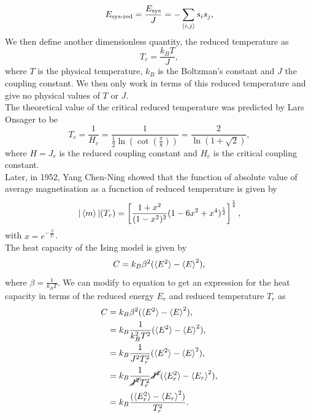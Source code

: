 \documentclass[twocolumn,a4paper,aps,amsmath,amssymb,floatfix,superscriptaddress]{revtex4-2}
\begin{document}
    \begin{equation}
        E_{\text{sys-red}} = \frac{E_{\text{sys}}}{J} = -\sum_{\braket{i, j}}s_is_j, \label{reduced_system_energy}
    \end{equation}
    We then define another dimensionless quantity, the reduced temperature as
    \begin{equation}
        T_r = \frac{k_BT}{J}, \label{reduced_temperature}
    \end{equation}
    where $T$ is the physical temperature, $k_B$ is the Boltzman's constant and $J$ the coupling constant. We then only work in terms of this reduced temperature and give no physical values of $T$ or $J$.\\
    The theoretical value of the critical reduced temperature was predicted by Lars Onsager to be
    \begin{equation}
        T_c = \frac{1}{H_c} = \frac{1}{\frac{1}{2}\ln(\cot(\frac{\pi}{8}))} = \frac{2}{\ln(1 + \sqrt{2})}, \label{critical_temperature}
    \end{equation}
    where $H = J_r$ is the reduced coupling constant and $H_c$ is the critical coupling constant\cite{Onsager1944}.\\
    Later, in 1952, Yang Chen-Ning showed that the function of absolute value of average magnetisation as a fucnction of reduced temperature is given by
    \begin{equation}
        |\braket{m}|(T_r) = \left[\frac{1 + x^2}{(1 - x^2)^2}(1 - 6x^2 + x^4)^{\frac{1}{2}}\right]^{\frac{1}{4}}, \label{magnetisation_over_temperature}
    \end{equation}
    with $x = e^{-\frac{2}{T_r}}$\cite{Yang1952}.\\
    The heat capacity of the Ising model is given by
    \begin{equation}
        C = k_B\beta^2(\braket{E^2} - \braket{E}^2),
    \end{equation}
    where $\beta = \frac{1}{k_BT}$\cite{Blundell2010}. We can modify to equation to get an expression for the heat capacity in terms of the reduced energy $E_r$ and reduced temperature $T_r$ as
    \begin{align*}
        C &= k_B\beta^2(\braket{E^2} - \braket{E}^2),\\
        &= k_B\frac{1}{k_B^2T^2}(\braket{E^2} - \braket{E}^2),\\
        &= k_B\frac{1}{J^2T_r^2}(\braket{E^2} - \braket{E}^2),\\
        &= k_B\frac{1}{\cancel{J^2}T_r^2}\cancel{J^2}(\braket{E_r^2} - \braket{E_r}^2),\\
        &= k_B\frac{(\braket{E_r^2} - \braket{E_r}^2)}{T_r^2}.
    \end{align*}
\end{document}
